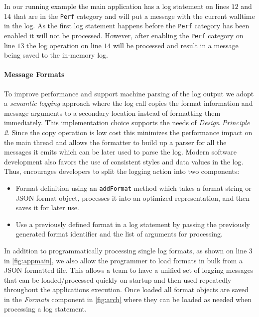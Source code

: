 In our running example the main application has a log statement on lines $12$ and $14$ 
that are in the \texttt{Perf} category and will put a message with the current walltime 
in the log. As the first log statement happens before the \texttt{Perf} category has 
been enabled it will not be processed. However, after enabling the \texttt{Perf} category 
on line $13$ the log operation on line $14$ will be processed and result in a message 
being saved to the in-memory log.

\paragraph{Message Formats}
\noindent
To improve performance and support machine parsing of the log output we 
adopt a \emph{semantic logging} approach where the log call copies the format 
information and message arguments to a secondary location instead of formatting them 
immediately. This implementation choice supports the needs of \emph{Design Principle 2}.
Since the copy operation is low cost this minimizes the 
performance impact on the main thread and allows the formatter to build up a 
parser for all the messages it emits which can be later used to parse the log. 
Modern software development also favors the use of consistent styles and data 
values in the log. Thus, \projn encourages developers to split the logging 
action into two components:
\begin{itemize}
\item Format definition using an \texttt{addFormat} method which takes a format 
string or JSON format object, processes it into an optimized representation, 
and then saves it for later use.
\item Use a previously defined format in a log statement by passing the 
previously generated format identifier and the list of 
arguments for processing.
\end{itemize}

In addition to programmatically processing single log formats, as shown on line 3 
in \autoref{fig:appmain}, we also allow the programmer to load formats in bulk 
from a JSON formatted file. This allows a team to have a unified set of logging 
messages that can be loaded/processed quickly on startup and then used repeatedly 
throughout the applications execution. Once loaded all format objects are saved 
in the \emph{Formats} component in \autoref{fig:arch} where they can be loaded 
as needed when processing a log statement.\\

